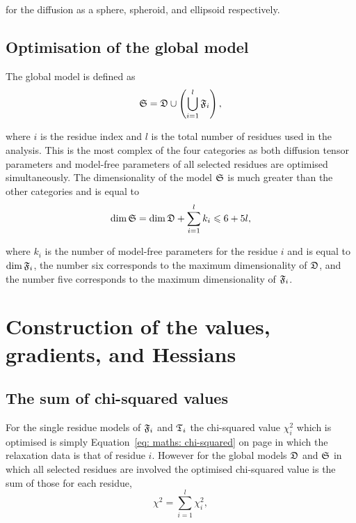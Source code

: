 \noindent for the diffusion as a sphere, spheroid, and ellipsoid respectively.




\subsection{Optimisation of the global model}

The global model is defined as
\begin{equation}
    \mathfrak{S} = \mathfrak{D} \cup \left( \bigcup_{i=1}^l \mathfrak{F}_i \right),
\end{equation}

\noindent where $i$ is the residue index and $l$ is the total number of residues used in the analysis.  This is the most complex of the four categories as both diffusion tensor parameters and model-free parameters of all selected residues are optimised simultaneously.  The dimensionality of the model $\mathfrak{S}$ is much greater than the other categories and is equal to
\begin{equation}
    \dim \mathfrak{S} = \dim \mathfrak{D} + \sum_{i=1}^l k_i \leqslant 6 + 5l,
\end{equation}

\noindent where $k_i$ is the number of model-free parameters for the residue $i$ and is equal to $\dim \mathfrak{F}_i$, the number six corresponds to the maximum dimensionality of $\mathfrak{D}$, and the number five corresponds to the maximum dimensionality of $\mathfrak{F}_i$.





\section{Construction of the values, gradients, and Hessians}



\subsection{The sum of chi-squared values}

For the single residue models of $\mathfrak{F}_i$ and $\mathfrak{T}_i$ the chi-squared value $\chi^2_i$ which is optimised is simply Equation~\eqref{eq: maths: chi-squared} on page \pageref{eq: maths: chi-squared} in which the relaxation data is that of residue $i$.  However for the global models $\mathfrak{D}$ and $\mathfrak{S}$ in which all selected residues are involved the optimised chi-squared value is the sum of those for each residue,
\begin{equation}
    \chi^2 = \sum^l_{i=1} \chi^2_i,
\end{equation}

